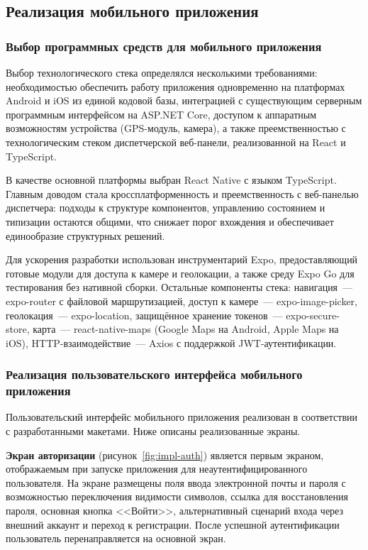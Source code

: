 \subsection{Реализация мобильного приложения}

\subsubsection{Выбор программных средств для мобильного приложения}

Выбор технологического стека определялся несколькими требованиями: необходимостью обеспечить работу приложения одновременно на платформах Android и iOS из единой кодовой базы, интеграцией с существующим серверным программным интерфейсом на ASP.NET Core, доступом к аппаратным возможностям устройства (GPS-модуль, камера), а также преемственностью с технологическим стеком диспетчерской веб-панели, реализованной на React и TypeScript.

В качестве основной платформы выбран React Native с языком TypeScript. Главным доводом стала кроссплатформенность и преемственность с веб-панелью диспетчера: подходы к структуре компонентов, управлению состоянием и типизации остаются общими, что снижает порог вхождения и обеспечивает единообразие структурных решений.

Для ускорения разработки использован инструментарий Expo, предоставляющий готовые модули для доступа к камере и геолокации, а также среду Expo Go для тестирования без нативной сборки. Остальные компоненты стека: навигация~--- expo-router с файловой маршрутизацией, доступ к камере~--- expo-image-picker, геолокация~--- expo-location, защищённое хранение токенов~--- expo-secure-store, карта~--- react-native-maps (Google Maps на Android, Apple Maps на iOS), HTTP-взаимодействие~--- Axios с поддержкой JWT-аутентификации.

\subsubsection{Реализация пользовательского интерфейса мобильного приложения}

Пользовательский интерфейс мобильного приложения реализован в соответствии с разработанными макетами. Ниже описаны реализованные экраны.

\textbf{Экран авторизации} (рисунок~\ref{fig:impl-auth}) является первым экраном, отображаемым при запуске приложения для неаутентифицированного пользователя. На экране размещены поля ввода электронной почты и пароля с возможностью переключения видимости символов, ссылка для восстановления пароля, основная кнопка <<Войти>>, альтернативный сценарий входа через внешний аккаунт и переход к регистрации. После успешной аутентификации пользователь перенаправляется на основной экран.

